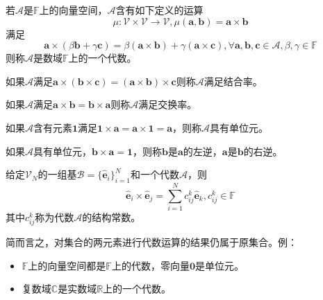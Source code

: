 \documentclass[main.tex]{subfiles}
\begin{document}
\begin{definition}[代数]
若$\mathcal{A}$是$\mathbb{F}$上的向量空间，$\mathcal{A}$含有如下定义的运算
\[\mu:\mathcal{V}\times\mathcal{V}\rightarrow\mathcal{V},\mu\left(\mathbf{a},\mathbf{b}\right)=\mathbf{a}\times\mathbf{b}\]
满足
\[\mathbf{a}\times\left(\beta\mathbf{b}+\gamma\mathbf{c}\right)=\beta\left(\mathbf{a}\times\mathbf{b}\right)+\gamma\left(\mathbf{a}\times\mathbf{c}\right),\forall\mathbf{a},\mathbf{b},\mathbf{c}\in\mathcal{A},\beta,\gamma\in\mathbb{F}\]
则称$\mathcal{A}$是数域$\mathbb{F}$上的一个代数。

如果$\mathcal{A}$满足$\mathbf{a}\times\left(\mathbf{b}\times\mathbf{c}\right)=\left(\mathbf{a}\times\mathbf{b}\right)\times\mathbf{c}$则称$\mathcal{A}$满足结合率。

如果$\mathcal{A}$满足$\mathbf{a}\times\mathbf{b}=\mathbf{b}\times\mathbf{a}$则称$\mathcal{A}$满足交换率。

如果$\mathcal{A}$含有元素$\bm{1}$满足$\bm{1}\times\mathbf{a}=\mathbf{a}\times\bm{1}=\mathbf{a}$，则称$\mathcal{A}$具有单位元。

如果$\mathcal{A}$具有单位元，$\mathbf{b}\times\mathbf{a}=\bm{1}$，则称$\mathbf{b}$是$\mathbf{a}$的左逆，$\mathbf{a}$是$\mathbf{b}$的右逆。

给定$\mathcal{V}_N$的一组基$\mathcal{B}=\{\hat{\mathbf{e}}_i\}_{i=1}^N$和一个代数$\mathcal{A}$，则
\[\hat{\mathbf{e}}_i\times\hat{\mathbf{e}}_j=\sum_{i=1}^Nc_{ij}^k\hat{\mathbf{e}}_k,c_{ij}^k\in\mathbb{F}\]
其中$c_{ij}^k$称为代数$\mathcal{A}$的结构常数。
\end{definition}

简而言之，对集合的两元素进行代数运算的结果仍属于原集合。例：
\begin{itemize}
    \item $\mathbb{F}$上的向量空间都是$\mathbb{F}$上的代数，零向量$\bm{0}$是单位元。
    \item 复数域$\mathbb{C}$是实数域$\mathbb{R}$上的一个代数。
\end{itemize}
\end{document}
